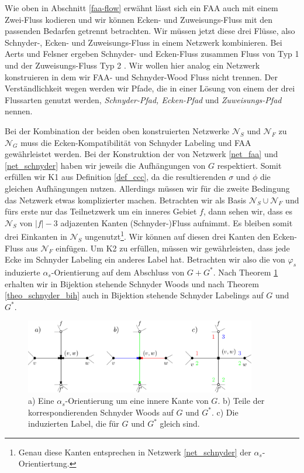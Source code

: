 Wie oben in Abschnitt \ref{faa-flow} erwähnt lässt sich ein FAA auch mit einem Zwei-Fluss kodieren und wir können Ecken- und Zuweisungs-Fluss mit den passenden Bedarfen getrennt betrachten. Wir müssen jetzt diese drei Flüsse, also Schnyder-, Ecken- und Zuweisungs-Fluss in einem Netzwerk kombinieren. Bei Aerts und Felsner ergeben Schnyder- und Ecken-Fluss zusammen Fluss von Typ 1 und der Zuweisungs-Fluss Typ 2 \cite{af15}. Wir wollen hier analog ein Netzwerk konstruieren in dem wir FAA- und Schnyder-Wood Fluss nicht trennen. Der Verständlichkeit wegen werden wir Pfade, die in einer Lösung von einem der drei Flussarten genutzt werden, \textit{Schnyder-Pfad, Ecken-Pfad} und \textit{Zuweisungs-Pfad} nennen.

Bei der Kombination der beiden oben konstruierten Netzwerke $\mathcal{N}_S$ und $\mathcal{N}_F$ zu $\mathcal{N}_G$ muss die Ecken-Kompatibilität von Schnyder Labeling und FAA gewährleistet werden. Bei der Konstruktion der von Netzwerk \ref{net_faa} und \ref{net_schnyder} haben wir jeweils die Aufhängungen von $G$ respektiert. Somit erfüllen wir K1 aus Definition \ref{def_ccc}, da die resultierenden $\sigma$ und $\phi$ die gleichen Aufhängungen nutzen. Allerdings müssen wir für die zweite Bedingung das Netzwerk etwas komplizierter machen. Betrachten wir als Basis $\mathcal{N}_S \cup \mathcal{N}_F$ und fürs erste nur das Teilnetzwerk um ein inneres Gebiet $f$, dann sehen wir, dass es $\mathcal{N}_S$ von $|f|-3$ adjazenten Kanten (Schnyder-)Fluss aufnimmt. Es bleiben somit drei Einkanten in $\mathcal{N}_S$ ungenutzt\footnote{Genau diese Kanten entsprechen in Netzwerk \ref{net_schnyder} der $\alpha_s$-Orientiertung.}. Wir können auf diesen drei Kanten den Ecken-Fluss aus $\mathcal{N}_F$ einfügen. Um K2 zu erfüllen, müssen wir gewährleisten, dass jede Ecke im Schnyder Labeling ein anderes Label hat. Betrachten wir also die von $\varphi_s$ induzierte $\alpha_s$-Orientierung auf dem Abschluss von $G+G^*$. Nach Theorem \ref{alpha_bij} erhalten wir in Bijektion stehende Schnyder Woods und nach Theorem \ref{theo_schnyder_bih} auch in Bijektion stehende Schnyder Labelings auf $G$ und $G^*$.

\begin{figure}[h]
	\centering
  	\includegraphics[width=0.9\textwidth]{alpha_bij.png}
  	\caption{a) Eine $\alpha_s$-Orientierung um eine innere Kante von $G$. b) Teile der korrespondierenden Schnyder Woods auf $G$ und $G^*$. c) Die induzierten Label, die für $G$ und $G^*$ gleich sind.}
	\label{alpha_bij}
\end{figure}

